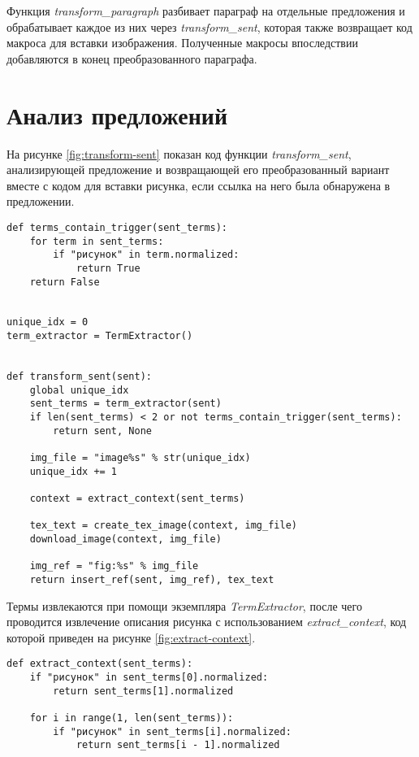Функция \emph{transform_paragraph} разбивает параграф на отдельные предложения и
обрабатывает каждое из них через \emph{transform_sent}, которая также возвращает
код макроса для вставки изображения. Полученные макросы впоследствии добавляются
в конец преобразованного параграфа.

\section{Анализ предложений}

На рисунке \ref{fig:transform-sent} показан код функции \emph{transform_sent},
анализирующей предложение и возвращающей его преобразованный вариант вместе с
кодом для вставки рисунка, если ссылка на него была обнаружена в предложении.

\begin{codewrap}[0.85]
\begin{verbatim}
def terms_contain_trigger(sent_terms):
    for term in sent_terms:
        if "рисунок" in term.normalized:
            return True
    return False


unique_idx = 0
term_extractor = TermExtractor()


def transform_sent(sent):
    global unique_idx
    sent_terms = term_extractor(sent)
    if len(sent_terms) < 2 or not terms_contain_trigger(sent_terms):
        return sent, None

    img_file = "image%s" % str(unique_idx)
    unique_idx += 1

    context = extract_context(sent_terms)

    tex_text = create_tex_image(context, img_file)
    download_image(context, img_file)

    img_ref = "fig:%s" % img_file
    return insert_ref(sent, img_ref), tex_text
\end{verbatim}
\caption{}\label{fig:transform-sent}
\end{codewrap}

Термы извлекаются при помощи экземпляра \emph{TermExtractor}, после чего
проводится извлечение описания рисунка с использованием \emph{extract_context},
код которой приведен на рисунке \ref{fig:extract-context}.

\begin{codewrap}[0.75]
\begin{verbatim}
def extract_context(sent_terms):
    if "рисунок" in sent_terms[0].normalized:
        return sent_terms[1].normalized

    for i in range(1, len(sent_terms)):
        if "рисунок" in sent_terms[i].normalized:
            return sent_terms[i - 1].normalized
\end{verbatim}
\caption{}\label{fig:extract-context}
\end{codewrap}

